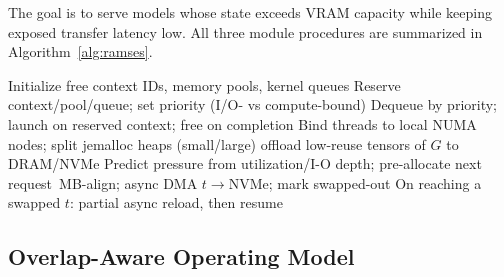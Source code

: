 The goal is to serve models whose state exceeds VRAM capacity while keeping exposed transfer latency low. All three module procedures are summarized in Algorithm~\ref{alg:ramses}.

\begin{algorithm}[t]
\caption{RAMSES module procedures}
\label{alg:ramses}
\scriptsize
\begin{algorithmic}[1]
  \State Initialize free context IDs, memory pools, kernel queues
    \State Reserve context/pool/queue; set priority (I/O- vs compute-bound)
  \EndFor
    \State Dequeue by priority; launch on reserved context; free on completion
  \EndWhile
\EndProcedure
{}
  \State Bind threads to local NUMA nodes; split jemalloc heaps (small/large)
     \State offload low-reuse tensors of $G$ to DRAM/NVMe \EndIf
    \State Predict pressure from utilization/I-O depth; pre-allocate next request
  \EndFor
\EndProcedure
{}
    \,MB-align; async DMA $t\!\to\!$NVMe; mark swapped-out
  \EndFor
    \State On reaching a swapped $t$: partial async reload, then resume
  \EndWhile
\EndProcedure
\end{algorithmic}
\end{algorithm}




\subsection{Overlap-Aware Operating Model}\label{sec:theory}

